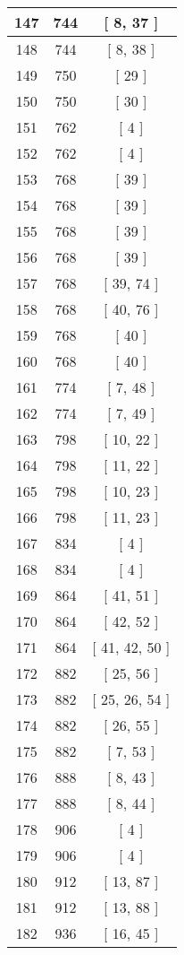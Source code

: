\begin{center}
\begin{longtable}[H]{|| c c c ||}
\hline
147 & 744 & [ 8, 37 ] \\ 
\hline
148 & 744 & [ 8, 38 ] \\ 
\hline
149 & 750 & [ 29 ] \\ 
\hline
150 & 750 & [ 30 ] \\ 
\hline
151 & 762 & [ 4 ] \\ 
\hline
152 & 762 & [ 4 ] \\ 
\hline
153 & 768 & [ 39 ] \\ 
\hline
154 & 768 & [ 39 ] \\ 
\hline
155 & 768 & [ 39 ] \\ 
\hline
156 & 768 & [ 39 ] \\ 
\hline
157 & 768 & [ 39, 74 ] \\ 
\hline
158 & 768 & [ 40, 76 ] \\ 
\hline
159 & 768 & [ 40 ] \\ 
\hline
160 & 768 & [ 40 ] \\ 
\hline
161 & 774 & [ 7, 48 ] \\ 
\hline
162 & 774 & [ 7, 49 ] \\ 
\hline
163 & 798 & [ 10, 22 ] \\ 
\hline
164 & 798 & [ 11, 22 ] \\ 
\hline
165 & 798 & [ 10, 23 ] \\ 
\hline
166 & 798 & [ 11, 23 ] \\ 
\hline
167 & 834 & [ 4 ] \\ 
\hline
168 & 834 & [ 4 ] \\ 
\hline
169 & 864 & [ 41, 51 ] \\ 
\hline
170 & 864 & [ 42, 52 ] \\ 
\hline
171 & 864 & [ 41, 42, 50 ] \\ 
\hline
172 & 882 & [ 25, 56 ] \\ 
\hline
173 & 882 & [ 25, 26, 54 ] \\ 
\hline
174 & 882 & [ 26, 55 ] \\ 
\hline
175 & 882 & [ 7, 53 ] \\ 
\hline
176 & 888 & [ 8, 43 ] \\ 
\hline
177 & 888 & [ 8, 44 ] \\ 
\hline
178 & 906 & [ 4 ] \\ 
\hline
179 & 906 & [ 4 ] \\ 
\hline
180 & 912 & [ 13, 87 ] \\ 
\hline
181 & 912 & [ 13, 88 ] \\ 
\hline
182 & 936 & [ 16, 45 ] \\ 

\end{longtable}
\end{center}
